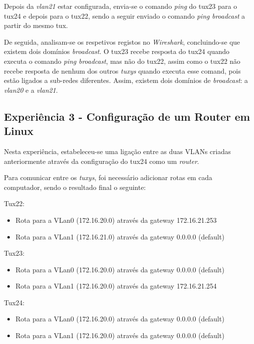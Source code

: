 \documentclass[11pt]{article}
\begin{document}
Depois da \textit{vlan21} estar configurada, envia-se o comando \textit{ping} do tux23 para o tux24 e depois para o tux22, sendo a seguir enviado o comando \textit{ping broadcast} a partir do mesmo tux.

De seguida, analisam-se os respetivos registos no \textit{Wireshark}, concluindo-se que existem dois domínios \textit{broadcast}. O tux23 recebe resposta do tux24 quando executa o comando \textit{ping broadcast}, mas não do tux22, assim como o tux22 não recebe resposta de nenhum dos outros \textit{tuxys} quando executa esse comand, pois estão ligados a sub-redes diferentes. Assim, existem dois domínios de \textit{broadcast}: a \textit{vlan20} e a \textit{vlan21}. 

\subsection{Experiência 3 - Configuração de um Router em Linux}

Nesta experiência, estabeleceu-se uma ligação entre as duas VLANs criadas anteriormente através da configuração do tux24 como um \textit{router}.

Para comunicar entre os \textit{tuxys}, foi necessário adicionar rotas em cada computador, sendo o resultado final o seguinte:

Tux22:
\begin{itemize}
\item Rota para a VLan0 (172.16.20.0) através da gateway 172.16.21.253
\item Rota para a VLan1 (172.16.21.0) através da gateway 0.0.0.0 (default)

\end{itemize}

Tux23:
\begin{itemize}
\item Rota para a VLan0 (172.16.20.0) através da gateway 0.0.0.0 (default)
\item Rota para a VLan1 (172.16.20.0) através da gateway 172.16.21.254

\end{itemize}

Tux24:
\begin{itemize}
\item Rota para a VLan0 (172.16.20.0) através da gateway 0.0.0.0 (default)
\item Rota para a VLan1 (172.16.20.0) através da gateway 0.0.0.0 (default)
	
\end{itemize}
\end{document}
